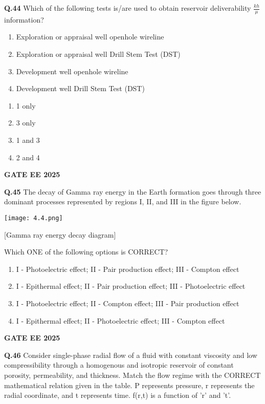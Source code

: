 \documentclass{article}
\begin{document}
\vspace{0.5cm}

\textbf{Q.44} Which of the following tests is/are used to obtain reservoir deliverability \(\frac{kh}{\mu}\) information?
\begin{enumerate}[label=\arabic*.]
    \item Exploration or appraisal well openhole wireline
    \item Exploration or appraisal well Drill Stem Test (DST)
    \item Development well openhole wireline
    \item Development well Drill Stem Test (DST)
\end{enumerate}
\begin{enumerate}[label=(\Alph*)]
    \item 1 only
    \item 3 only
    \item 1 and 3
    \item 2 and 4
\end{enumerate}
\textbf{GATE EE 2025}

\vspace{0.5cm}

\textbf{Q.45} The decay of Gamma ray energy in the Earth formation goes through three dominant processes represented by regions I, II, and III in the figure below.

\texttt{[image: 4.4.png]}

[Gamma ray energy decay diagram]

Which ONE of the following options is CORRECT?

\begin{enumerate}[label=(\Alph*)]
    \item I - Photoelectric effect; II - Pair production effect; III - Compton effect
    \item I - Epithermal effect; II - Pair production effect; III - Photoelectric effect
    \item I - Photoelectric effect; II - Compton effect; III - Pair production effect
    \item I - Epithermal effect; II - Photoelectric effect; III - Compton effect
\end{enumerate}
\textbf{GATE EE 2025}

\vspace{0.5cm}

\textbf{Q.46} Consider single-phase radial flow of a fluid with constant viscosity and low compressibility through a homogenous and isotropic reservoir of constant porosity, permeability, and thickness. Match the flow regime with the CORRECT mathematical relation given in the table. P represents pressure, r represents the radial coordinate, and t represents time. f(r,t) is a function of 'r' and 't'.
\end{document}
